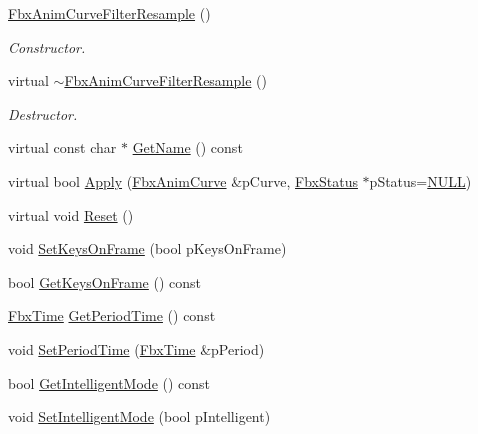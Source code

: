 \begin{DoxyCompactItemize}
\item 
\hyperlink{class_fbx_anim_curve_filter_resample_ae5da0aba84bf6db3d9cda6a4aeb5824f}{Fbx\+Anim\+Curve\+Filter\+Resample} ()
\begin{DoxyCompactList}\small\item\em Constructor. \end{DoxyCompactList}\item 
virtual \hyperlink{class_fbx_anim_curve_filter_resample_a9424bc3a1a9796265126c399d8e8fb5a}{$\sim$\+Fbx\+Anim\+Curve\+Filter\+Resample} ()
\begin{DoxyCompactList}\small\item\em Destructor. \end{DoxyCompactList}\item 
virtual const char $\ast$ \hyperlink{class_fbx_anim_curve_filter_resample_a67303296eba915d2a9fde63c2557c3f9}{Get\+Name} () const
\item 
virtual bool \hyperlink{class_fbx_anim_curve_filter_resample_aa4edbed0ce74836a77fe4fd907c604a6}{Apply} (\hyperlink{class_fbx_anim_curve}{Fbx\+Anim\+Curve} \&p\+Curve, \hyperlink{class_fbx_status}{Fbx\+Status} $\ast$p\+Status=\hyperlink{fbxarch_8h_a070d2ce7b6bb7e5c05602aa8c308d0c4}{N\+U\+LL})
\item 
virtual void \hyperlink{class_fbx_anim_curve_filter_resample_a149622ab0dd1ffd26ca1e59f31aaed93}{Reset} ()
\item 
void \hyperlink{class_fbx_anim_curve_filter_resample_abb2e4701aa3e44d945cfa92254aabbb0}{Set\+Keys\+On\+Frame} (bool p\+Keys\+On\+Frame)
\item 
bool \hyperlink{class_fbx_anim_curve_filter_resample_af91489566c2c8445995dd265648646ea}{Get\+Keys\+On\+Frame} () const
\item 
\hyperlink{class_fbx_time}{Fbx\+Time} \hyperlink{class_fbx_anim_curve_filter_resample_a0efe607fa3febdd058b03a7ac444bfd4}{Get\+Period\+Time} () const
\item 
void \hyperlink{class_fbx_anim_curve_filter_resample_a1d2369b1cd4a656a79e05b10f7faadd4}{Set\+Period\+Time} (\hyperlink{class_fbx_time}{Fbx\+Time} \&p\+Period)
\item 
bool \hyperlink{class_fbx_anim_curve_filter_resample_ae0b81c640c35b6b2d0a34b5586f2f053}{Get\+Intelligent\+Mode} () const
\item 
void \hyperlink{class_fbx_anim_curve_filter_resample_a8ac3cafa7fe863a9d3205452f6f15c49}{Set\+Intelligent\+Mode} (bool p\+Intelligent)
\end{DoxyCompactItemize}
